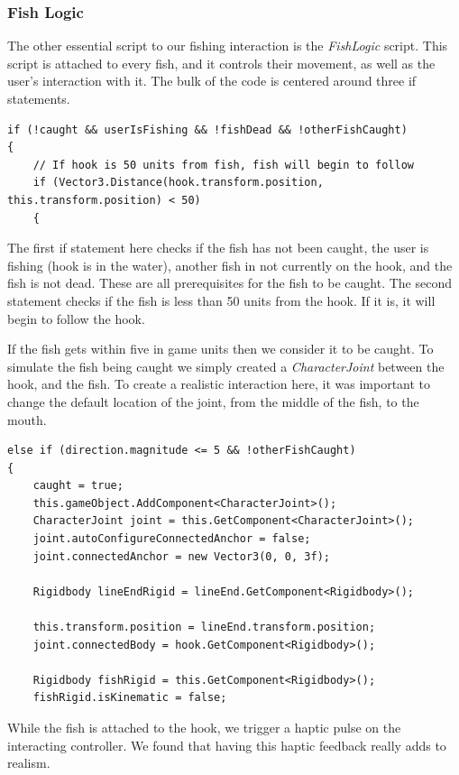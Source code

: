 \documentclass[10pt,journal,compsoc,onecolumn, draftclsnofoot]{IEEEtran}
\begin{document}
\subsubsection{Fish Logic}
The other essential script to our fishing interaction is the \textit{FishLogic} script. This script is attached to every fish, and it controls their movement, as well as the user's interaction with it. The bulk of the code is centered around three if statements.

\begin{lstlisting}[language={[Sharp]C}]
if (!caught && userIsFishing && !fishDead && !otherFishCaught)
{
	// If hook is 50 units from fish, fish will begin to follow
	if (Vector3.Distance(hook.transform.position, this.transform.position) < 50)
	{
\end{lstlisting}

The first if statement here checks if the fish has not been caught, the user is fishing (hook is in the water), another fish in not currently on the hook, and the fish is not dead. These are all prerequisites for the fish to be caught. The second statement checks if the fish is less than 50 units from the hook. If it is, it will begin to follow the hook.

If the fish gets within five in game units then we consider it to be caught. To simulate the fish being caught we simply created a \textit{CharacterJoint} between the hook, and the fish. To create a realistic interaction here, it was important to change the default location of the joint, from the middle of the fish, to the mouth.

\begin{lstlisting}[language={[Sharp]C}]
else if (direction.magnitude <= 5 && !otherFishCaught)
{
	caught = true;
	this.gameObject.AddComponent<CharacterJoint>();
	CharacterJoint joint = this.GetComponent<CharacterJoint>();
	joint.autoConfigureConnectedAnchor = false;
	joint.connectedAnchor = new Vector3(0, 0, 3f);

	Rigidbody lineEndRigid = lineEnd.GetComponent<Rigidbody>();

	this.transform.position = lineEnd.transform.position;
	joint.connectedBody = hook.GetComponent<Rigidbody>();

	Rigidbody fishRigid = this.GetComponent<Rigidbody>();
	fishRigid.isKinematic = false;
\end{lstlisting}

While the fish is attached to the hook, we trigger a haptic pulse on the interacting controller. We found that having this haptic feedback really adds to realism.
\end{document}
